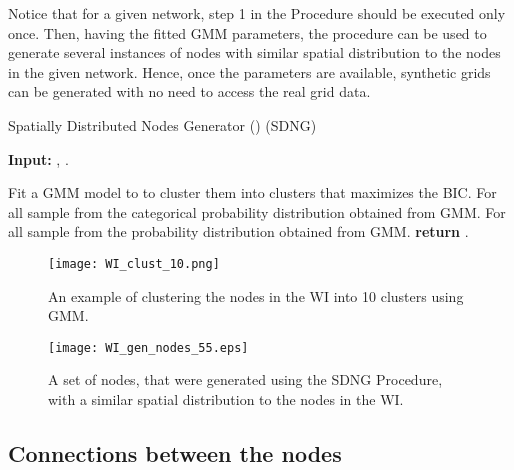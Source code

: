 \documentclass[10pt,journal]{IEEEtran}
\begin{document}
Notice that for a given network, step 1 in the Procedure should be executed only once. Then, having the fitted GMM parameters, the procedure can be used to generate several instances of  nodes with similar spatial distribution to the nodes in the given network. Hence, once the parameters are available, synthetic grids can be generated with no need to access the real grid data.


\setcounter{algocf}{0}
\begin{procedure}[t]
\footnotesize
\caption{Spatially Distributed Nodes Generator () (SDNG)}
\begin{trivlist}
\item\textbf{Input:} , .
\end{trivlist}
\vspace*{-3mm}
\begin{algorithmic}[1]
\STATE Fit a GMM model to  to cluster them into  clusters that maximizes the BIC.
\STATE For all  sample  from the categorical probability distribution  obtained from GMM.
\STATE For all  sample  from the probability distribution  obtained from GMM.
\STATE \textbf{return} .
\end{algorithmic}
\label{pro:SDNG}
\end{procedure}

\begin{figure}[t]
\centering
\vspace*{-0.2cm}
\texttt{[image: WI\_clust\_10.png]}
\vspace*{-0.2cm}
\caption{An example of clustering the nodes in the WI into 10 clusters using GMM.}
\label{fig:WI_clust_10}
\vspace*{0.2cm}
\end{figure}

\begin{figure}[t]
\centering
\vspace*{-0.2cm}
\texttt{[image: WI\_gen\_nodes\_55.eps]}
\vspace*{-0.2cm}
\caption{A set of nodes, that were generated using the SDNG Procedure, with a similar spatial distribution to the nodes in the WI.}
\label{fig:WI_gen_nodes_55}
\vspace*{0.2cm}
\end{figure}



\subsection{Connections between the nodes}\label{sec:node_con}
\end{document}
